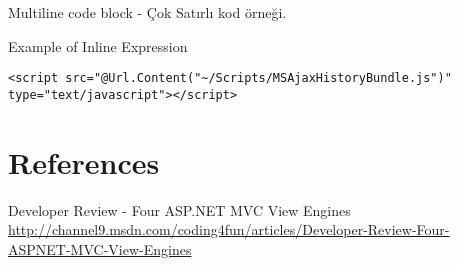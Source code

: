 \documentclass[10pt,a4paper,draft]{article}
\begin{document}
Multiline code block - Çok Satırlı kod örneği.










Example of Inline Expression

\begin{lstlisting}
<script src="@Url.Content("~/Scripts/MSAjaxHistoryBundle.js")" type="text/javascript"></script>
\end{lstlisting}



\section*{References}

Developer Review - Four ASP.NET MVC View Engines
\url{http://channel9.msdn.com/coding4fun/articles/Developer-Review-Four-ASPNET-MVC-View-Engines}
\end{document}
